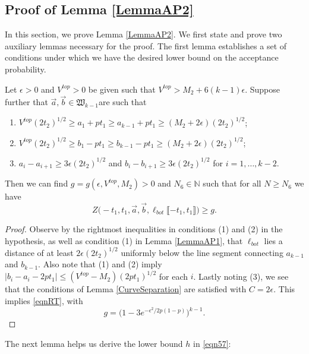 \subsection{Proof of Lemma \ref{LemmaAP2}} \label{sect62} In this section, we prove Lemma \ref{LemmaAP2}. We first state and prove two auxiliary lemmas necessary for the proof. The first lemma establishes a set of conditions under which we have the desired lower bound on the acceptance probability. 

\begin{lemma}\label{LemmaBP1} Let $\epsilon > 0$ and $V^{top} > 0$ be given such that $V^{top} > M_2 + 6 (k-1) \epsilon$. Suppose further that $\vec{a}, \vec{b} \in \mathfrak{W}_{k-1}$are such that 
	\begin{enumerate}
		\item $V^{top} (2t_2)^{1/2} \geq a_1 + p t_1 \geq a_{k-1} + pt_1 \geq (M_2 + 2 \epsilon) (2t_2)^{1/2}$;
		\item $V^{top} (2t_2)^{1/2} \geq b_1 - p t_1 \geq b_{k-1} - pt_1 \geq (M_2 + 2 \epsilon) (2t_2)^{1/2}$; 
		\item $a_i -a_{i+1} \geq 3\epsilon (2t_2)^{1/2}$ and $b_{i} - b_{i+1} \geq 3 \epsilon (2t_2)^{1/2}$ for $i = 1, \dots, k-2$.
	\end{enumerate}
	Then we can find $g = g(\epsilon, V^{top}, M_2) > 0$ and $N_6 \in \mathbb{N}$ such that for all $N \geq N_6$ we have 
	\begin{equation}\label{eqnRT}
	Z\big(  -t_1, t_1, \vec{a} ,\vec{b}, \ell_{bot}\llbracket -t_1, t_1\rrbracket\big) \geq g.
	\end{equation}
\end{lemma}

\begin{proof}
	
	Observe by the rightmost inequalities in conditions (1) and (2) in the hypothesis, as well as condition (1) in Lemma \ref{LemmaAP1}, that $\ell_{bot}$ lies a distance of at least $2\epsilon(2t_2)^{1/2}$ uniformly below the line segment connecting $a_{k-1}$ and $b_{k-1}$. Also note that (1) and (2) imply $|b_i-a_i-2pt_1| \leq (V^{top} - M_2)(2pt_1)^{1/2}$ for each $i$. Lastly noting (3), we see that the conditions of Lemma \ref{CurveSeparation} are satisfied with $C = 2\epsilon$. This implies \eqref{eqnRT}, with
	\[
	g = \big(1 - 3e^{-\epsilon^2/2p(1-p)}\big)^{k-1}.
	\]
	
\end{proof}

\noindent The next lemma helps us derive the lower bound $h$ in \eqref{eqn57}:

